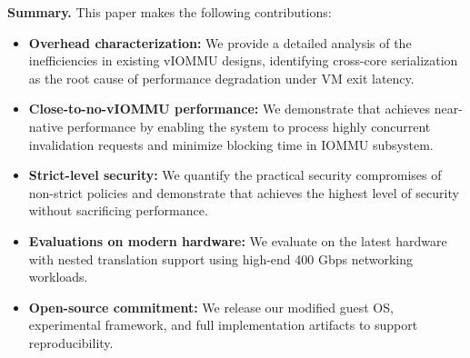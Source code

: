 \textbf{Summary.} This paper makes the following contributions:
\begin{itemize}
    \item \textbf{Overhead characterization:} We provide a detailed analysis of the inefficiencies in existing vIOMMU designs,
    identifying cross-core serialization as the root cause of performance degradation under VM exit latency.
    \item \textbf{Close-to-no-vIOMMU performance:} We demonstrate that \brand achieves near-native performance
    by enabling the system to process highly concurrent invalidation requests and minimize blocking time in IOMMU subsystem.
    \item \textbf{Strict-level security:} We quantify the practical security compromises of non-strict policies
    and demonstrate that \brand achieves the highest level of security without sacrificing performance.
    \item \textbf{Evaluations on modern hardware:} We evaluate \brand on the latest hardware
    with nested translation support using high-end 400 Gbps networking workloads.
    \item \textbf{Open-source commitment:} We release our modified guest OS,
    experimental framework, and full implementation artifacts to support reproducibility.
\end{itemize}
